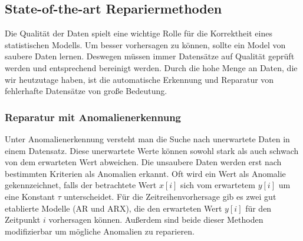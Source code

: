 \subsection{State-of-the-art Repariermethoden}
Die Qualität der Daten spielt eine wichtige Rolle für die Korrektheit
eines statistischen Modells. Um besser vorhersagen zu können, sollte ein Model
von saubere Daten lernen. Deswegen müssen immer Datensätze auf Qualität geprüft
werden und entsprechend bereinigt werden. Durch die hohe Menge an Daten, die
wir heutzutage haben, ist die automatische Erkennung und Reparatur von
fehlerhafte Datensätze von große Bedeutung.

\subsubsection{Reparatur mit Anomalienerkennung}\label{sec:anomalienerkennung}
Unter Anomalienerkennung versteht man die Suche nach unerwartete Daten in einem
Datensatz. Diese unerwartete Werte können sowohl stark als auch schwach von dem
erwarteten Wert abweichen. Die unsaubere Daten werden erst nach bestimmten
Kriterien als Anomalien erkannt. Oft wird ein Wert als Anomalie gekennzeichnet,
falls der betrachtete Wert $x[i]$ sich vom erwartetem $y[i]$ um eine Konstant
$\tau$ unterscheidet. Für die Zeitreihenvorhersage gib es zwei gut etablierte
Modelle (AR und ARX), die den erwarteten Wert $y[i]$ für den Zeitpunkt $i$ vorhersagen
können. Außerdem sind beide dieser Methoden modifizierbar um mögliche Anomalien
zu reparieren.
